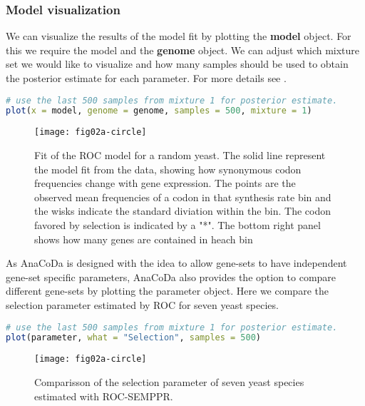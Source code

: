\subsubsection{Model visualization}
We can visualize the results of the model fit by plotting the \textbf{model} object. 
For this we require the model and the \textbf{genome} object. 
We can adjust which mixture set we would like to visualize and how many samples should be used to obtain the posterior estimate for each parameter. 
For more details see \citet{gilchrist2015}.

\begin{lstlisting}[language=R]
# use the last 500 samples from mixture 1 for posterior estimate.
plot(x = model, genome = genome, samples = 500, mixture = 1)
\end{lstlisting}

\begin{figure}[h]
  \centering
  \texttt{[image: fig02a-circle]}\\
  \caption{Fit of the ROC model for a random yeast. The solid line represent the model fit from the data,
showing how synonymous codon frequencies change with gene expression. The points are the observed mean
frequencies of a codon in that synthesis rate bin and the wisks indicate the standard diviation within the bin.
The codon favored by selection is indicated by a "*". The bottom right panel shows how many genes are
contained in heach bin}
  \label{fig:cub_dummy}
\end{figure} 

As AnaCoDa is designed with the idea to allow gene-sets to have independent gene-set specific parameters, AnaCoDa also provides the option to compare different gene-sets by plotting the parameter object. 
Here we compare the selection parameter estimated by ROC for seven yeast species.

\begin{lstlisting}[language=R]
# use the last 500 samples from mixture 1 for posterior estimate.
plot(parameter, what = "Selection", samples = 500)
\end{lstlisting}



\begin{figure}[h]
  \centering
  \texttt{[image: fig02a-circle]}\\
  \caption{Comparisson of the selection parameter of seven yeast species estimated with ROC-SEMPPR.}
  \label{fig:comp_dummy}
\end{figure} 